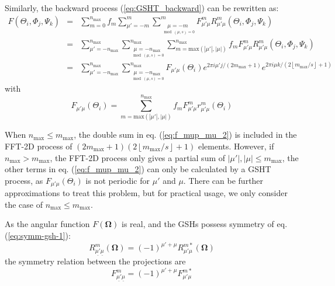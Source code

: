Similarly, the backward process (\ref{eq:GSHT_backward}) can be rewritten
as:
\begin{eqnarray}
F(\Theta_{i},\Phi_{j},\Psi_{k}) & = & \sum_{m=0}^{n_{\mathrm{max}}}f_{m}\sum_{\mu'=-m}^{m}\sum_{\underset{\mod(\mu,s)=0}{\mu=-m}}^{m}F_{\mu'\mu}^{m}R_{\mu'\mu}^{m}(\Theta_{i},\Phi_{j},\Psi_{k})\label{eq:f_mup_mu_2}\\
 & = & \sum_{\mu'=-n_{\mathrm{max}}}^{n_{\mathrm{max}}}\sum_{\underset{\mod(\mu,s)=0}{\mu=-n_{\mathrm{max}}}}^{n_{\mathrm{max}}}\sum_{m=\mathrm{max}\left(\left|\mu'\right|,\left|\mu\right|\right)}^{n_{\mathrm{max}}}f_{m}F_{\mu'\mu}^{m}R_{\mu'\mu}^{m}(\Theta_{i},\Phi_{j},\Psi_{k})\nonumber \\
 & = & \sum_{\mu'=-n_{\mathrm{max}}}^{n_{\mathrm{max}}}\sum_{\underset{\mod(\mu,s)=0}{\mu=-n_{\mathrm{max}}}}^{n_{\mathrm{max}}}F_{\mu'\mu}(\Theta_{i})e^{2\pi i\mu'j/(2m_{\mathrm{max}}+1)}e^{2\pi i\mu k/(2\left\lfloor m_{\mathrm{max}}/s\right\rfloor +1)}\nonumber 
\end{eqnarray}
with
\begin{equation}
F_{\mu'\mu}(\Theta_{i})=\sum_{m=\mathrm{max}\left(\left|\mu'\right|,\left|\mu\right|\right)}^{n_{\mathrm{max}}}f_{m}F_{\mu'\mu}^{m}r_{\mu'\mu}^{m}(\Theta_{i})\label{eq:f_mup_mu_3}
\end{equation}

When
$n_{\max}\leq m_{\max}$, the double sum in eq. (\ref{eq:f_mup_mu_2})
is included in the \acs{FFT}-2D process of $\left(2m_{\mathrm{max}}+1\right)\left(2\left\lfloor m_{\mathrm{max}}/s\right\rfloor +1\right)$
elements. However, if $n_{\max}>m_{\max}$, the \acs{FFT}-2D process
only gives a partial sum of $\left|\mu'\right|,\left|\mu\right|\leq m_{\max}$,
the other terms in eq. (\ref{eq:f_mup_mu_2}) can only be calculated
by a \acs{GSHT} process, as $F_{\mu'\mu}(\Theta_{i})$ is not periodic
for $\mu'$ and $\mu$. There can be further approximations to treat
this problem, but for practical usage, we only consider the case of
$n_{\max}\leq m_{\max}$.

As the angular function $F(\mathbf{\Omega})$ is real, and the \acs{GSH}s
possess symmetry of eq. (\ref{eq:symm-gsh-1}):
\begin{equation}
R_{\underline{\mu'}\underline{\mu}}^{m}(\mathbf{\Omega})=\left(-1\right)^{\mu'+\mu}R_{\mu'\mu}^{m*}(\mathbf{\Omega})
\end{equation}
the symmetry relation between the projections are
\begin{equation}
F_{\underline{\mu'}\underline{\mu}}^{m}=\left(-1\right)^{\mu'+\mu}F_{\mu'\mu}^{m*}\label{eq:symm_f_m_mup_mu}
\end{equation}

